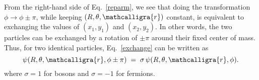 \documentclass[pra,12pt]{revtex4}
\begin{document}
From the right-hand side of Eq.~\eqref{reparm}, we see that doing the
transformation $\phi \rightarrow \phi \pm \pi$, while keeping $(R,
\theta, \mathcalligra{r})$ constant, is equivalent to exchanging the
values of $(x_1,y_1)$ and $(x_2,y_2)$.  In other words, the two
particles can be exchanged by a rotation of $\pm \pi$ around their
fixed center of mass.  Thus, for two identical particles,
Eq.~\eqref{exchange} can be written as
\begin{equation}
  \psi(R, \theta, \mathcalligra{r}, \phi \pm \pi) \;=\;
  \sigma \, \psi(R, \theta, \mathcalligra{r}, \phi).
\end{equation}
where $\sigma = 1$ for bosons and $\sigma = -1$ for fermions.
\end{document}
